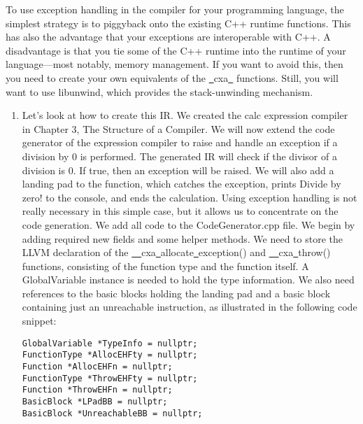 To use exception handling in the compiler for your programming language, the simplest strategy is to piggyback onto the existing C++ runtime functions. This has also the advantage that your exceptions are interoperable with C++. A disadvantage is that you tie some of the C++ runtime into the runtime of your language—most notably, memory management. If you want to avoid this, then you need to create your own equivalents of the \underline{~}cxa\underline{~} functions. Still, you will want to use libunwind, which provides the stack-unwinding mechanism.\par

\begin{enumerate}
\item Let's look at how to create this IR. We created the calc expression compiler in Chapter 3, The Structure of a Compiler. We will now extend the code generator of the expression compiler to raise and handle an exception if a division by 0 is performed. The generated IR will check if the divisor of a division is 0. If true, then an exception will be raised. We will also add a landing pad to the function, which catches the exception, prints Divide by zero! to the console, and ends the calculation. Using exception handling is not really necessary in this simple case, but it allows us to concentrate on the code generation. We add all code to the CodeGenerator.cpp file. We begin by adding required new fields and some helper methods. We need to store the LLVM declaration of the \underline{~~}cxa\underline{~}allocate\underline{~}exception() and \underline{~~}cxa\underline{~}throw() functions, consisting of the function type and the function itself. A GlobalVariable instance is needed to hold the type information. We also need references to the basic blocks holding the landing pad and a basic block containing just an unreachable instruction, as illustrated in the following code snippet:
\begin{lstlisting}[caption={}]
GlobalVariable *TypeInfo = nullptr;
FunctionType *AllocEHFty = nullptr;
Function *AllocEHFn = nullptr;
FunctionType *ThrowEHFty = nullptr;
Function *ThrowEHFn = nullptr;
BasicBlock *LPadBB = nullptr;
BasicBlock *UnreachableBB = nullptr;
\end{lstlisting}


\end{enumerate}
